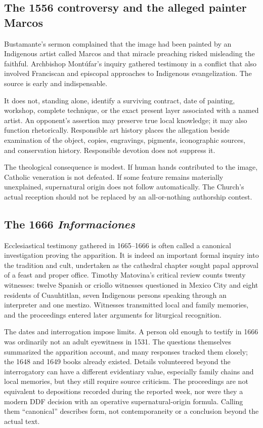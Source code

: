 \subsection{The 1556 controversy and the alleged painter Marcos}

Bustamante's sermon complained that the image had been painted by an Indigenous artist called Marcos and that miracle preaching risked misleading the faithful. Archbishop Montúfar's inquiry gathered testimony in a conflict that also involved Franciscan and episcopal approaches to Indigenous evangelization. The source is early and indispensable.

It does not, standing alone, identify a surviving contract, date of painting, workshop, complete technique, or the exact present layer associated with a named artist. An opponent's assertion may preserve true local knowledge; it may also function rhetorically. Responsible art history places the allegation beside examination of the object, copies, engravings, pigments, iconographic sources, and conservation history. Responsible devotion does not suppress it.

The theological consequence is modest. If human hands contributed to the image, Catholic veneration is not defeated. If some feature remains materially unexplained, supernatural origin does not follow automatically. The Church's actual reception should not be replaced by an all-or-nothing authorship contest.

\subsection{The 1666 \emph{Informaciones}}

Ecclesiastical testimony gathered in 1665--1666 is often called a canonical investigation proving the apparition. It is indeed an important formal inquiry into the tradition and cult, undertaken as the cathedral chapter sought papal approval of a feast and proper office. Timothy Matovina's critical review counts twenty witnesses: twelve Spanish or criollo witnesses questioned in Mexico City and eight residents of Cuauhtitlan, seven Indigenous persons speaking through an interpreter and one mestizo. Witnesses transmitted local and family memories, and the proceedings entered later arguments for liturgical recognition.

The dates and interrogation impose limits. A person old enough to testify in 1666 was ordinarily not an adult eyewitness in 1531. The questions themselves summarized the apparition account, and many responses tracked them closely; the 1648 and 1649 books already existed. Details volunteered beyond the interrogatory can have a different evidentiary value, especially family chains and local memories, but they still require source criticism. The proceedings are not equivalent to depositions recorded during the reported week, nor were they a modern DDF decision with an operative supernatural-origin formula. Calling them “canonical” describes form, not contemporaneity or a conclusion beyond the actual text.

